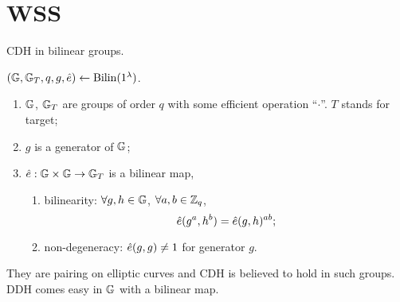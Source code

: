 \section{\acl{WSS}}

\ac{CDH} in bilinear groups.

\begin{definition}
	$\left( \mathbb{G}, \mathbb{G}_{T}, q, g, \hat{e} \right) \leftarrow \mathrm{Bilin}(1^{\lambda})$.
	\begin{enumerate}
		\item $\mathbb{G}$, $\mathbb{G}_{T}$ are groups of order $q$ with some efficient operation ``$\cdot$''.
			$T$ stands for target;
		\item $g$ is a generator of $\mathbb{G}$;
		\item $\hat{e} : \mathbb{G} \times \mathbb{G} \to \mathbb{G}_{T}$ is a bilinear map, \ie
			\begin{enumerate}
				\item bilinearity: $\forall g, h \in \mathbb{G}$, $\forall a, b \in \mathbb{Z}_q$,
					\begin{equation*}
						\hat{e}(g^a, h^b) = \hat{e}(g, h)^{ab};
					\end{equation*}
				\item non-degeneracy: $\hat{e}(g,g) \neq 1$ for generator $g$. \qedhere
			\end{enumerate}
	\end{enumerate}
\end{definition}

\begin{observation}
	They are pairing on elliptic curves and \ac{CDH} is believed to hold in such groups.
	\ac{DDH} comes easy in $\mathbb{G}$ with a bilinear map.
\end{observation}

